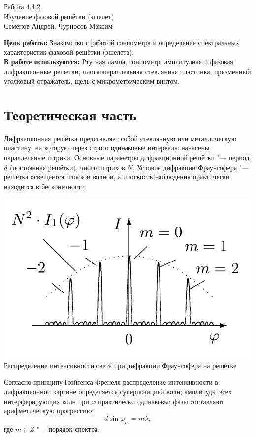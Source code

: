 

\begin{center}
  \LARGE{Работа 4.4.2}\\[0.2cm]
  \LARGE{Изучение фазовой решётки (эшелет)}\\[0.2cm]
  \large{Семёнов Андрей, Чурносов Максим}\\[0.2cm]
\end{center}

\textbf{Цель работы:} Знакомство с работой гониометра и определение спектральных характеристик фаховой решётки (эшелета).\\
\textbf{В работе используются:} Ртутная лампа, гониометр, амплитудная и фазовая дифракционные решетки, плоскопараллельная стеклянная пластинка, призменный уголковый отражатель, щель с микрометрическим винтом.\
\section*{Теоретическая часть}
Дифркационная решётка представляет собой стеклянную или металлическую пластину, на которую через строго одинаковые интервалы нанесены параллельные штрихи. Основные параметры дифракционной решётки "--- период $d$ (постоянная решётки), число штрихов $N$.
Условие дифракции Фраунгофера "--- решётка освещается плоской волной, а плоскость наблюдения практически находится в бесконечности.

\begin{center}
    \includegraphics[width = 1.0\linewidth]{4.4.2/1.png}
    {Распределение интенсивности света при дифракции Фраунгофера на решётке}
\end{center}

Согласно принципу Гюйгенса-Френеля распределение интенсивности в дифракционной картине определяется суперпозицией волн; амплитуды всех интерферирующих волн при $\varphi$ практически одинаковы; фазы составляют арифметическую прогрессию:
\[
    d \sin \varphi_m = m \lambda,
 \]
 где $m \in Z$ "--- порядок спектра.
 
